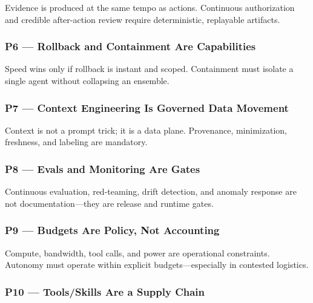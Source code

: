 \documentclass[11pt]{article}
\begin{document}
Evidence is produced at the same tempo as actions. Continuous
authorization and credible after-action review require deterministic,
replayable artifacts.

\hypertarget{p6-rollback-and-containment-are-capabilities}{%
\subsubsection{P6 --- Rollback and Containment Are Capabilities}\label{p6-rollback-and-containment-are-capabilities}}

Speed wins only if rollback is instant and scoped. Containment must
isolate a single agent without collapsing an ensemble.

\hypertarget{p7-context-engineering-is-governed-data-movement}{%
\subsubsection{P7 --- Context Engineering Is Governed Data Movement}\label{p7-context-engineering-is-governed-data-movement}}

Context is not a prompt trick; it is a data plane. Provenance,
minimization, freshness, and labeling are mandatory.

\hypertarget{p8-evals-and-monitoring-are-gates}{%
\subsubsection{P8 --- Evals and Monitoring Are Gates}\label{p8-evals-and-monitoring-are-gates}}

Continuous evaluation, red-teaming, drift detection, and anomaly
response are not documentation---they are release and runtime gates.

\hypertarget{p9-budgets-are-policy-not-accounting}{%
\subsubsection{P9 --- Budgets Are Policy, Not Accounting}\label{p9-budgets-are-policy-not-accounting}}

Compute, bandwidth, tool calls, and power are operational constraints.
Autonomy must operate within explicit budgets---especially in contested
logistics.

\hypertarget{p10-toolsskills-are-a-supply-chain}{%
\subsubsection{P10 --- Tools/Skills Are a Supply Chain}\label{p10-toolsskills-are-a-supply-chain}}
\end{document}
